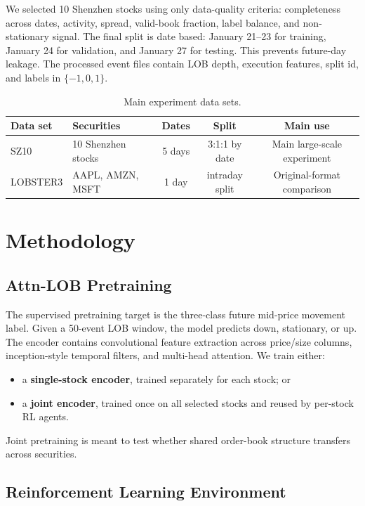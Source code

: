 \documentclass[11pt]{article}
\begin{document}
We selected 10 Shenzhen stocks using only data-quality criteria: completeness
across dates, activity, spread, valid-book fraction, label balance, and
non-stationary signal. The final split is date based: January 21--23 for
training, January 24 for validation, and January 27 for testing. This prevents
future-day leakage. The processed event files contain LOB depth, execution
features, split id, and labels in $\{-1,0,1\}$.

\begin{table}[H]
\centering
\caption{Main experiment data sets.}
\label{tab:datasets}
\begin{tabularx}{\textwidth}{lXccc}
\toprule
Data set & Securities & Dates & Split & Main use \\
\midrule
SZ10 & 10 Shenzhen stocks & 5 days & 3:1:1 by date & Main large-scale experiment \\
LOBSTER3 & AAPL, AMZN, MSFT & 1 day & intraday split & Original-format comparison \\
\bottomrule
\end{tabularx}
\end{table}

\section{Methodology}

\subsection{Attn-LOB Pretraining}

The supervised pretraining target is the three-class future mid-price movement
label. Given a 50-event LOB window, the model predicts down, stationary, or up.
The encoder contains convolutional feature extraction across price/size columns,
inception-style temporal filters, and multi-head attention. We train either:

\begin{itemize}
  \item a \textbf{single-stock encoder}, trained separately for each stock; or
  \item a \textbf{joint encoder}, trained once on all selected stocks and reused
  by per-stock RL agents.
\end{itemize}

Joint pretraining is meant to test whether shared order-book structure transfers
across securities.

\subsection{Reinforcement Learning Environment}
\end{document}
